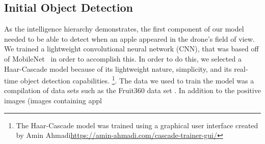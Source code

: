 \subsection{Initial Object Detection}
As the intelligence hierarchy demonstrates, the first component of our model needed to be able to detect when an apple appeared in the drone's field of view. 
We trained a lightweight convolutional neural network (CNN), that was based off of MobileNet~\cite{Sandler2018,PyTorchMobileNet} in order to accomplish this. 
In order to do this, we selected a Haar-Cascade model because of its lightweight nature, simplicity, and its real-time object detection capabilities.
\footnote{The Haar-Cascade model was trained using a graphical user interface created by Amin Ahmadi\url{https://amin-ahmadi.com/cascade-trainer-gui/}}. 
The data we used to train the model was a compilation of data sets such as the Fruit360 data set \cite{Fruit360}.
In addition to the positive images (images containing appl